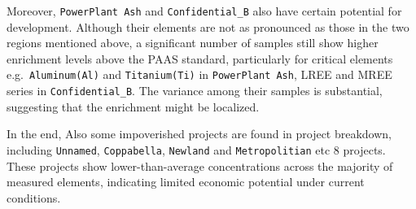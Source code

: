 \documentclass[11pt,a4paper,]{article}
\begin{document}
Moreover, \texttt{PowerPlant\ Ash} and \texttt{Confidential\_B} also have certain potential for development. Although their elements are not as pronounced as those in the two regions mentioned above, a significant number of samples still show higher enrichment levels above the PAAS standard, particularly for critical elements e.g.~\texttt{Aluminum(Al)} and \texttt{Titanium(Ti)} in \texttt{PowerPlant\ Ash}, LREE and MREE series in \texttt{Confidential\_B}. The variance among their samples is substantial, suggesting that the enrichment might be localized.

In the end, Also some impoverished projects are found in project breakdown, including \texttt{Unnamed}, \texttt{Coppabella}, \texttt{Newland} and \texttt{Metropolitian} etc 8 projects. These projects show lower-than-average concentrations across the majority of measured elements, indicating limited economic potential under current conditions.
\end{document}
